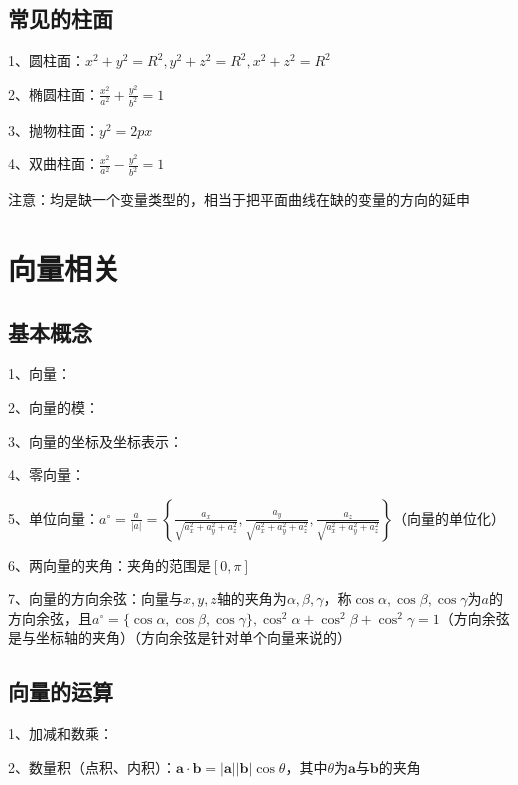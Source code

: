 \subsection{常见的柱面}

1、圆柱面：$ x^{2}+y^{2}=R^{2}, y^{2}+z^{2}=R^{2}, x^{2}+z^{2}=R^{2} $

2、椭圆柱面：$ \frac{x^{2}}{a^{2}}+\frac{y^{2}}{b^{2}}=1 $

3、抛物柱面：$ y^{2}=2 p x $

4、双曲柱面：$ \frac{x^{2}}{a^{2}}-\frac{y^{2}}{b^{2}}=1 $

注意：均是缺一个变量类型的，相当于把平面曲线在缺的变量的方向的延申

\section{向量相关}



\subsection{基本概念}

1、向量：

2、向量的模：

3、向量的坐标及坐标表示：

4、零向量：

5、单位向量：$ a^{\circ}=\frac{a}{|a|}=\left\{\frac{a_{x}}{\sqrt{a_{x}^{2}+a_{y}^{2}+a_{z}^{2}}}, \frac{a_{y}}{\sqrt{a_{x}^{2}+a_{y}^{2}+a_{z}^{2}}}, \frac{a_{z}}{\sqrt{a_{x}^{2}+a_{y}^{2}+a_{z}^{2}}}\right\} $（向量的单位化）

6、两向量的夹角：夹角的范围是$ [0,\pi] $

7、向量的方向余弦：向量与$ x,y,z $轴的夹角为$ \alpha, \beta, \gamma $，称$ \cos \alpha, \cos \beta, \cos \gamma $为$ a $的方向余弦，且$ a^{\circ}=\{\cos \alpha, \cos \beta, \cos \gamma\}, \cos ^{2} \alpha+\cos ^{2} \beta+\cos ^{2} \gamma=1 $（方向余弦是与坐标轴的夹角）（方向余弦是针对单个向量来说的）



\subsection{向量的运算}

1、加减和数乘：

2、数量积（点积、内积）：$ \boldsymbol{a} \cdot \boldsymbol{b}=|\boldsymbol{a}||\boldsymbol{b}| \cos \theta $，其中$ \theta $为$ \boldsymbol{a} $与$ \boldsymbol{b} $的夹角

